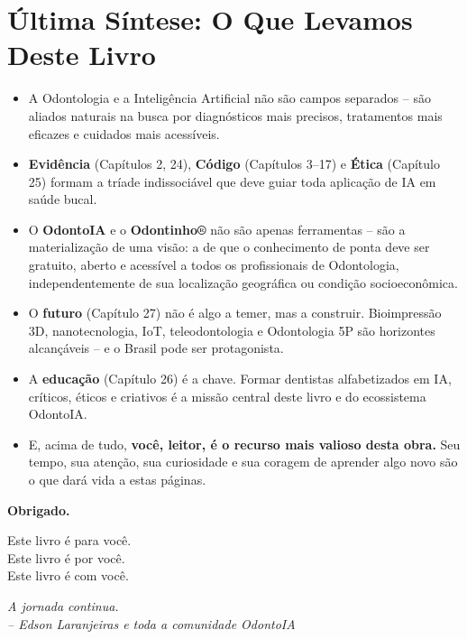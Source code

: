 \section{Última Síntese: O Que Levamos Deste Livro}
\label{sec:ultima-sintese}

\niveldois

\begin{itemize}
  \item A Odontologia e a Inteligência Artificial não são campos separados --
    são aliados naturais na busca por diagnósticos mais precisos, tratamentos
    mais eficazes e cuidados mais acessíveis.

  \item \textbf{Evidência} (Capítulos 2, 24), \textbf{Código} (Capítulos 3--17)
    e \textbf{Ética} (Capítulo 25) formam a tríade indissociável que deve guiar
    toda aplicação de IA em saúde bucal.

  \item O \textbf{OdontoIA} e o \textbf{Odontinho®} não são apenas ferramentas
    -- são a materialização de uma visão: a de que o conhecimento de ponta deve
    ser gratuito, aberto e acessível a todos os profissionais de Odontologia,
    independentemente de sua localização geográfica ou condição socioeconômica.

  \item O \textbf{futuro} (Capítulo 27) não é algo a temer, mas a construir.
    Bioimpressão 3D, nanotecnologia, IoT, teleodontologia e Odontologia 5P são
    horizontes alcançáveis -- e o Brasil pode ser protagonista.

  \item A \textbf{educação} (Capítulo 26) é a chave. Formar dentistas
    alfabetizados em IA, críticos, éticos e criativos é a missão central deste
    livro e do ecossistema OdontoIA.

  \item E, acima de tudo, \textbf{você, leitor, é o recurso mais valioso desta
    obra.} Seu tempo, sua atenção, sua curiosidade e sua coragem de aprender
    algo novo são o que dará vida a estas páginas.
\end{itemize}

\vspace{1cm}

\begin{center}
\begin{mdframed}[
  linecolor=corPrimaria,
  linewidth=3pt,
  backgroundcolor=corPrimaria!5,
  roundcorner=4pt,
  innertopmargin=15pt,
  innerbottommargin=15pt
]
  \Large\textbf{\textcolor{corPrimaria}{Obrigado.}}

  \bigskip

  \normalsize
  Este livro é para você. \\
  Este livro é por você. \\
  Este livro é com você.

  \bigskip

  \textit{A jornada continua.} \\
  \textit{-- Edson Laranjeiras e toda a comunidade OdontoIA}
\end{mdframed}
\end{center}

\endinput
